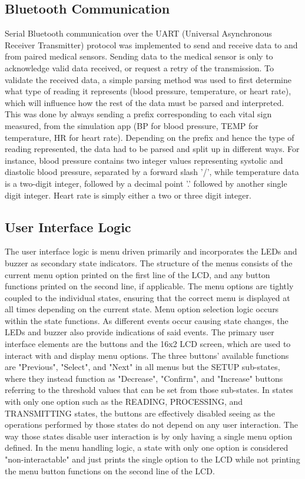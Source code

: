 \subsection{Bluetooth Communication}
Serial Bluetooth communication over the UART (Universal Asynchronous Receiver Transmitter) protocol was implemented to send and receive data to and from paired medical sensors. Sending data to the medical sensor is only to acknowledge valid data received, or request a retry of the transmission. To validate the received data, a simple parsing method was used to first determine what type of reading it represents (blood pressure, temperature, or heart rate), which will influence how the rest of the data must be parsed and interpreted. This was done by always sending a prefix corresponding to each vital sign measured, from the simulation app (BP for blood pressure, TEMP for temperature, HR for heart rate). Depending on the prefix and hence the type of reading represented, the data had to be parsed and split up in different ways. For instance, blood pressure contains two integer values representing systolic and diastolic blood pressure, separated by a forward slash '/', while temperature data is a two-digit integer, followed by a decimal point '.' followed by another single digit integer. Heart rate is simply either a two or three digit integer.

\subsection{User Interface Logic}
The user interface logic is menu driven primarily and incorporates the LEDs and buzzer as secondary state indicators. The structure of the menus consists of the current menu option printed on the first line of the LCD, and any button functions printed on the second line, if applicable. The menu options are tightly coupled to the individual states, ensuring that the correct menu is displayed at all times depending on the current state. Menu option selection logic occurs within the state functions. As different events occur causing state changes, the LEDs and buzzer also provide indications of said events. The primary user interface elements are the buttons and the 16x2 LCD screen, which are used to interact with and display menu options. The three buttons' available functions are "Previous", "Select", and "Next" in all menus but the SETUP sub-states, where they instead function as "Decrease", "Confirm", and "Increase" buttons referring to the threshold values that can be set from those sub-states. In states with only one option such as the READING, PROCESSING, and TRANSMITTING states, the buttons are effectively disabled seeing as the operations performed by those states do not depend on any user interaction. The way those states disable user interaction is by only having a single menu option defined. In the menu handling logic, a state with only one option is considered "non-interactable" and just prints the single option to the LCD while not printing the menu button functions on the second line of the LCD.

